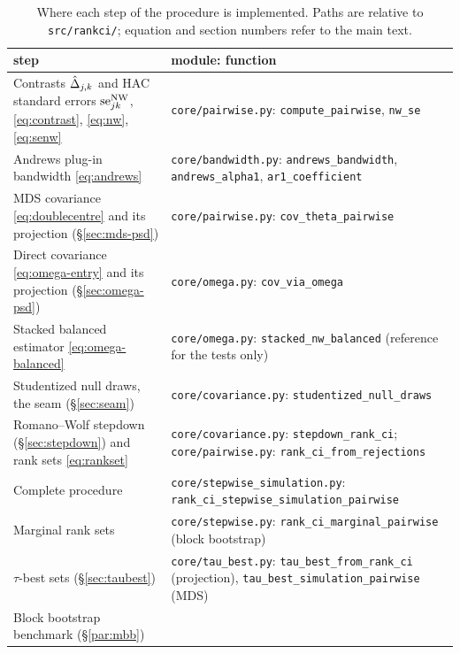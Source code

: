 \begin{table}[htb]
  \centering
  \caption[From the method to the code]{Where each step of the procedure is
  implemented. Paths are relative to \texttt{src/rankci/}; equation and section
  numbers refer to the main text.}
  \label{tab:impl-code}
  \small
  \begin{tabular}{p{5.4cm}p{8.4cm}}
    \toprule
    step & module: function\\
    \midrule
    Contrasts $\hat{\Delta}_{j,k}$ and HAC standard errors $\mathrm{se}^{\mathrm{NW}}_{jk}$,
    \eqref{eq:contrast}, \eqref{eq:nw}, \eqref{eq:senw}
      & \texttt{core/pairwise.py}: \texttt{compute\_pairwise}, \texttt{nw\_se}\\
    Andrews plug-in bandwidth \eqref{eq:andrews}
      & \texttt{core/bandwidth.py}: \texttt{andrews\_bandwidth},
        \texttt{andrews\_alpha1}, \texttt{ar1\_coefficient}\\
    MDS covariance \eqref{eq:doublecentre} and its projection
    (\S\ref{sec:mds-psd})
      & \texttt{core/pairwise.py}: \texttt{cov\_theta\_pairwise}\\
    Direct covariance \eqref{eq:omega-entry} and its projection
    (\S\ref{sec:omega-psd})
      & \texttt{core/omega.py}: \texttt{cov\_via\_omega}\\
    Stacked balanced estimator \eqref{eq:omega-balanced}
      & \texttt{core/omega.py}: \texttt{stacked\_nw\_balanced} (reference for the
        tests only)\\
    Studentized null draws, the seam (\S\ref{sec:seam})
      & \texttt{core/covariance.py}: \texttt{studentized\_null\_draws}\\
    Romano--Wolf stepdown (\S\ref{sec:stepdown}) and rank sets
    \eqref{eq:rankset}
      & \texttt{core/covariance.py}: \texttt{stepdown\_rank\_ci};\newline
        \texttt{core/pairwise.py}: \texttt{rank\_ci\_from\_rejections}\\
    Complete procedure
      & \texttt{core/stepwise\_simulation.py}:\newline
        \texttt{rank\_ci\_stepwise\_simulation\_pairwise}\\
    Marginal rank sets
      & \texttt{core/stepwise.py}: \texttt{rank\_ci\_marginal\_pairwise} (block bootstrap)\\
    $\tau$-best sets (\S\ref{sec:taubest})
      & \texttt{core/tau\_best.py}: \texttt{tau\_best\_from\_rank\_ci}
        (projection), \texttt{tau\_best\_simulation\_pairwise} (MDS)\\
    Block bootstrap benchmark (\S\ref{par:mbb})

\end{tabular}
\end{table}
